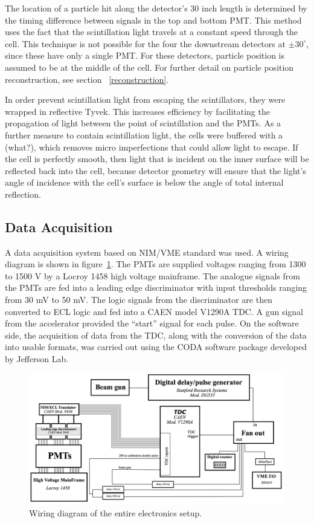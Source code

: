 The location of a particle hit along the detector's 30 inch length is determined by the timing difference between signals in the top and bottom PMT. This method uses the fact that the scintillation light travels at a constant speed through the cell. This technique is not possible for the four the downstream detectors at $\pm 30^{\circ}$, since these have only a single PMT. For these detectors, particle position is assumed to be at the middle of the cell. For further detail on particle position reconstruction, see section ~\ref{reconstruction}. 

In order prevent scintillation light from escaping the scintillators, they were wrapped in reflective Tyvek. This increases efficiency by facilitating the propagation of light between the point of scintillation and the PMTs. As a further measure to contain scintillation light, the cells were buffered with a (what?), which removes micro imperfections that could allow light to escape. If the cell is perfectly smooth, then light that is incident on the inner surface will be reflected back into the cell, because detector geometry will ensure that the light's angle of incidence with the cell's surface is below the angle of total internal reflection. 

\subsection{Data Acquisition}
A data acquisition system based on NIM/VME standard was used. A wiring diagram is shown in figure~\ref{fig:WiringDiagram}. The PMTs are supplied voltages ranging from 1300 to 1500 V by a Locroy 1458 high voltage mainframe. The analogue signals from the PMTs are fed into a leading edge discriminator with input thresholds ranging from 30 mV to 50 mV. The logic signals from the discriminator are then converted to ECL logic and fed into a CAEN model V1290A TDC. A gun signal from the accelerator provided the “start” signal for each pulse.
On the software side, the acquisition of data from the TDC, along with the conversion of the data into usable formats, was carried out using the CODA software package developed by Jefferson Lab.  

\begin{figure}[h]
\includegraphics[width=\textwidth]{Content/Methods/WiringDiagram.png}
\caption{Wiring diagram of the entire electronics setup. }
\label{fig:WiringDiagram}
\end{figure}